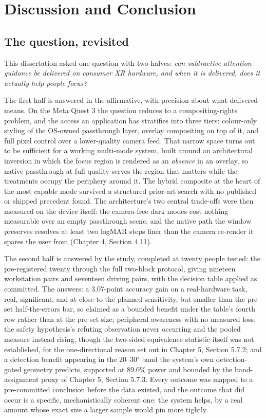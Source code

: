 \chapter{Discussion and Conclusion}

\section{The question, revisited}

This dissertation asked one question with two halves: \textit{can subtractive attention guidance be
delivered on consumer XR hardware, and when it is delivered, does it actually help people focus?}

The first half is answered in the affirmative, with precision about what delivered means. On the Meta
Quest 3 the question reduces to a compositing-rights problem, and the access an application has
stratifies into three tiers: colour-only styling of the OS-owned passthrough layer, overlay
compositing on top of it, and full pixel control over a lower-quality camera feed. That narrow space
turns out to be sufficient for a working multi-mode system, built around an architectural inversion
in which the focus region is rendered as an \textit{absence} in an overlay, so native passthrough at
full quality serves the region that matters while the treatments occupy the periphery around it. The
hybrid composite at the heart of the most capable mode survived a structured prior-art search with no
published or shipped precedent found. The architecture's two central trade-offs were then measured on
the device itself: the camera-free dark modes cost nothing measurable over an empty passthrough scene, and the
native path the window preserves resolves at least two logMAR steps finer than the camera re-render
it spares the user from (Chapter 4, Section 4.11).

The second half is answered by the study, completed at twenty people tested: the pre-registered
twenty through the full two-block protocol, giving nineteen
workstation pairs and seventeen driving pairs, with the decision table applied
as committed. The answers:
a 3.07-point accuracy gain on a real-hardware task, real, significant, and at close to the planned
sensitivity, but
smaller than the pre-set half-the-errors bar, so claimed as a bounded benefit under the table's
fourth row rather than at the pre-set size; peripheral awareness with no measured loss, the safety
hypothesis's refuting observation never occurring and the pooled measure instead rising, though the
two-sided equivalence statistic itself was not established, for the one-directional reason set out in
Chapter 5, Section 5.7.2; and a detection benefit appearing in
the 20--30$^{\circ}$ band the system's own detection-gated geometry predicts, supported at 89.0\%
power and bounded by the band-assignment proxy of Chapter 5, Section 5.7.3. Every outcome was mapped to a pre-committed conclusion before the data existed, and the
outcome that did occur is
a specific, mechanistically coherent one: the system helps, by a real amount whose exact size a
larger sample would pin more tightly.

